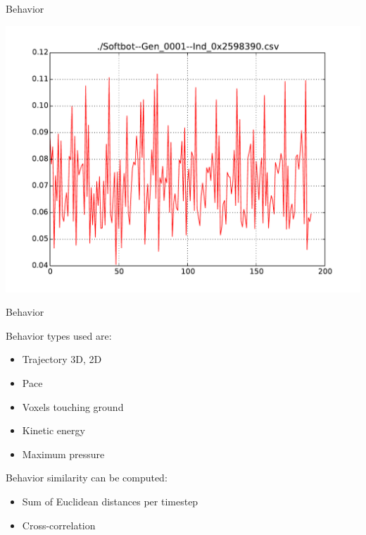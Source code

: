 \documentclass{beamer}
\begin{document}
\begin{frame}{Behavior}
\begin{center}
\includegraphics[height=0.15\textheight]{figures/behaviorPace.pdf}
\end{center}
\end{frame}


\begin{frame}{Behavior}
\begin{block}{Behavior types used are:}
\begin{itemize}
\item Trajectory 3D, 2D
\item Pace
\item Voxels touching ground
\item Kinetic energy
\item Maximum pressure
\end{itemize}
\end{block}
\begin{block}{Behavior similarity can be computed:}
\begin{itemize}
\item Sum of Euclidean distances per timestep
\item Cross-correlation
\end{itemize}
\end{block}
\end{frame}
\end{document}
